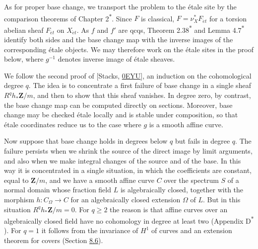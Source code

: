 \documentclass[11pt]{article}
\newcommand{\bpout}[1]{#1\textsuperscript{\hyperlink{bp-outside}{\ensuremath{\ast}}}}
\begin{document}
\label{bp8}%
As for proper base change, we transport the problem to the étale site by the comparison theorems of Chapter \bpout{2}. Since \(F\) is classical, \(F=\nu_X^*F_{\acute{e}t}\) for a torsion abelian sheaf \(F_{\acute{e}t}\) on \(X_{\acute{e}t}\). As \(f\) and \(f'\) are qcqs, Theorem \bpout{2.38} and Lemma \bpout{4.7} identify both sides and the base change map with the inverse images of the corresponding étale objects. We may therefore work on the étale sites in the proof below, where \(g^{-1}\) denotes inverse image of étale sheaves.

We follow the second proof of [Stacks, \href{https://stacks.math.columbia.edu/tag/0EYU}{0EYU}], an induction on the cohomological degree \(q\). The idea is to concentrate a first failure of base change in a single sheaf \(R^qh_*\mathbf Z/m\), and then to show that this sheaf vanishes. In degree zero, by contrast, the base change map can be computed directly on sections. Moreover, base change may be checked étale locally and is stable under composition, so that étale coordinates reduce us to the case where \(g\) is a smooth affine curve.

Now suppose that base change holds in degrees below \(q\) but fails in degree \(q\). The failure persists when we shrink the source of the direct image by limit arguments, and also when we make integral changes of the source and of the base. In this way it is concentrated in a single situation, in which the coefficients are constant, equal to \(\mathbf Z/m\), and we have a smooth affine curve \(C\) over the spectrum \(S\) of a normal domain whose fraction field \(L\) is algebraically closed, together with the morphism \(h:C_\Omega\to C\) for an algebraically closed extension \(\Omega\) of \(L\). But in this situation \(R^qh_*\mathbf Z/m=0\). For \(q\geq2\) the reason is that affine curves over an algebraically closed field have no cohomology in degree at least two (Appendix \bpout{D}). For \(q=1\) it follows from the invariance of \(H^1\) of curves and an extension theorem for covers (Section \hyperref[bp30]{8.6}).


\end{document}
